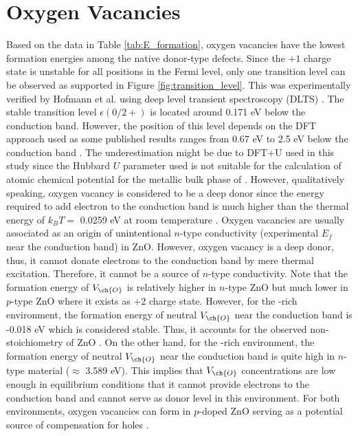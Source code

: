 \clearpage

\section{Oxygen Vacancies}
Based on the data in Table \ref{tab:E_formation}, oxygen vacancies have the lowest formation energies among the native donor-type defects. Since the $+1$ charge state is unstable for all positions in the Fermi level, only one transition level can be observed as supported in Figure \ref{fig:transition_level}. This was experimentally verified by Hofmann et al. using deep level transient spectroscopy (DLTS) \citep{Hofmann2007}.
The stable transition level $\epsilon(0/2+)$ is located around 0.171 eV below the conduction band. However, the position of this level depends on the DFT approach used as some published results ranges from 0.67 eV to 2.5 eV below the conduction band \citep{Lany2010, Oba2008, Paudel2008}. The underestimation might be due to DFT+U used in this study since the Hubbard $U$ parameter used is not suitable for the calculation of atomic chemical potential for the metallic bulk phase of  \citep{Lany2010}. However, qualitatively speaking, oxygen vacancy is considered to be a deep donor since the energy required to add electron to the conduction band is much higher than the thermal energy of $k_B T = $ 0.0259 eV at room temperature \citep{Freysoldt2014}. Oxygen vacancies are usually associated as an origin of unintentional $n$-type conductivity (experimental $E_f$ near the conduction band) in ZnO. However, oxygen vacancy is a deep donor, thus, it cannot donate electrons to the conduction band by mere thermal excitation. Therefore, it cannot be a source of $n$-type conductivity. Note that the formation energy of $V_{\ch{O}}$ is relatively higher in  $n$-type ZnO  but much lower in $p$-type ZnO where it exists as $+2$ charge state. However, for the -rich environment, the formation energy of neutral $V_{\ch{O}}$  near the conduction band is -0.018 eV which is considered stable. Thus, it accounts for the observed non-stoichiometry of ZnO  \citep{Oba2011}. On the other hand, for the -rich environment, the formation energy of neutral $V_{\ch{O}}$  near the conduction band is quite high in $n$-type material ($\approx$ 3.589 eV). This implies that  $V_{\ch{O}}$ concentrations are low enough in equilibrium conditions that it cannot provide electrons to the conduction band and cannot serve as donor level in this environment. For both environments, oxygen vacancies can form in $p$-doped ZnO serving as a potential source of compensation for holes \citep{Janotti2007}.


